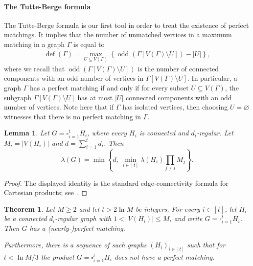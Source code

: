 \documentclass[10pt,a4paper]{article}
\newtheorem{theorem}{Theorem}
\newtheorem{lemma}[thm]{Lemma}
\newcommand{\defi}{\operatorname{def}}
\newcommand{\odd}{\operatorname{odd}}
\begin{document}
\paragraph{The Tutte-Berge formula}

The Tutte-Berge formula \cite{B62} is our first tool in order to treat the existence of perfect matchings. It implies that the number of unmatched vertices in a maximum matching in a graph $\Gamma$ is equal to 
\begin{align} \label{eq:Tutte-Berge}
    \defi(\Gamma)= \max_{U\subseteq V(\Gamma)} \left\{\odd\left(\Gamma[V(\Gamma)\setminus U]\right)- |U|\right\},
\end{align}
where we recall that $\odd\left(\Gamma[V(\Gamma)\setminus U]\right)$ is the number of connected components with an odd number of vertices in $\Gamma[V(\Gamma)\setminus U]$. In particular, a graph $\Gamma$ has a perfect matching if and only if for every subset $U\subseteq V(\Gamma)$, the subgraph $\Gamma[V(\Gamma)\setminus U]$ has at most $|U|$ connected components with an odd number of vertices. Note here that if $\Gamma$ has isolated vertices, then choosing $U=\varnothing$ witnesses that there is no perfect matching in $\Gamma$.

\begin{lemma}\label{lem:product-connectivity}
Let $G=\square_{i=1}^t H_i$, where every $H_i$ is connected and $d_i$-regular.
Let $M_i=|V(H_i)|$ and $d=\sum_{i=1}^t d_i$.
Then
\[
  \lambda(G)=
  \min\left\{d,\ \min_{i\in[t]}\lambda(H_i)\prod_{j\ne i}M_j\right\}.
\]
\end{lemma}

\begin{proof}
The displayed identity is the standard edge-connectivity formula for Cartesian products; see \cite[Chapter~5]{HIK11}.
\end{proof}

\begin{theorem}\label{th:deterministic}
Let $M\ge2$ and let $t>2 \ln M$ be integers. For every $i\in[t]$, let $H_i$ be a connected $d_i$-regular graph with $1<|V(H_i)|\le M$, and write $G=\square_{i=1}^t H_i$. Then $G$ has a (nearly-)perfect matching.

Furthermore, there is a sequence of such graphs $(H_i)_{i \in [t]}$ such that for $t<\ln M/3$ the product $G=\square_{i=1}^t H_i$ does not have a perfect matching.
\end{theorem}
\end{document}
